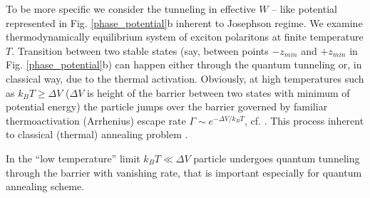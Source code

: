 \documentclass[aps, pre, preprint, groupedaddress, superscriptaddress, showkeys, showpacs] {revtex4-1}
\begin{document}
To  be more specific we consider the tunneling in  effective $W$ -- like potential represented in Fig. \ref{phase_potential}b  inherent to  Josephson regime. We examine thermodynamically equilibrium system of exciton polaritons at finite temperature $T$.  Transition between two stable states (say, between points $-z_{min}$ and $+z_{min}$ in Fig. \ref{phase_potential}b) can happen  either through the quantum tunneling or, in classical way, due to the thermal activation. 
Obviously, at high temperatures such as $k_{B}T\ge\Delta V$ ($\Delta V$ is height of the barrier between two states with minimum of potential energy) the particle jumps over the barrier governed by familiar thermoactivation (Arrhenius) escape rate $\Gamma \sim e^{-\Delta V /k_{B}T}$, cf. \cite{Larkin}. This process inherent to classical (thermal) annealing problem \cite{Das}. 

In the ``low temperature'' limit $k_{B}T\ll\Delta V$ particle undergoes quantum tunneling through the barrier with vanishing rate, that is important especially for quantum annealing scheme. 
\end{document}
